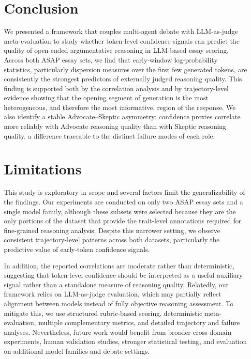 \documentclass[11pt]{article}
\begin{document}
\section{Conclusion}
We presented a framework that couples multi-agent debate with LLM-as-judge meta-evaluation to study whether token-level confidence signals can predict the quality of open-ended argumentative reasoning in LLM-based essay scoring. Across both ASAP essay sets, we find that early-window log-probability statistics, particularly dispersion measures over the first few generated tokens, are consistently the strongest predictors of externally judged reasoning quality. This finding is supported both by the correlation analysis and by trajectory-level evidence showing that the opening segment of generation is the most heterogeneous, and therefore the most informative, region of the response. We also identify a stable Advocate–Skeptic asymmetry: confidence proxies correlate more reliably with Advocate reasoning quality than with Skeptic reasoning quality, a difference traceable to the distinct failure modes of each role.

\section*{Limitations}
This study is exploratory in scope and several factors limit the generalizability of the findings. Our experiments are conducted on only two ASAP essay sets and a single model family, although these subsets were selected because they are the only portions of the dataset that provide the trait-level annotations required for fine-grained reasoning analysis. Despite this narrower setting, we observe consistent trajectory-level patterns across both datasets, particularly the predictive value of early-token confidence signals.

In addition, the reported correlations are moderate rather than deterministic, suggesting that token-level confidence should be interpreted as a useful auxiliary signal rather than a standalone measure of reasoning quality. Relatedly, our framework relies on LLM-as-judge evaluation, which may partially reflect alignment between models instead of fully objective reasoning assessment. To mitigate this, we use structured rubric-based scoring, deterministic meta-evaluation, multiple complementary metrics, and detailed trajectory and failure analyses. Nevertheless, future work would benefit from broader cross-domain experiments, human validation studies, stronger statistical testing, and evaluation on additional model families and debate settings.
\end{document}
